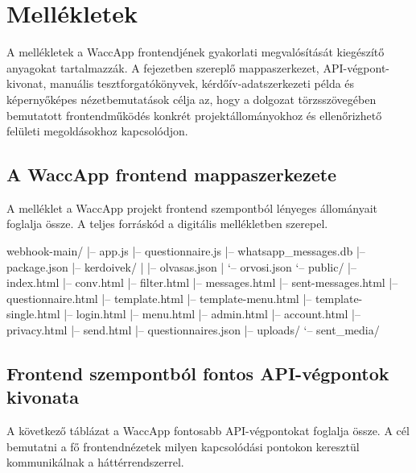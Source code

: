 \chapter{Mellékletek}
A mellékletek a WaccApp frontendjének gyakorlati megvalósítását kiegészítő anyagokat tartalmazzák. A fejezetben szereplő mappaszerkezet, API-végpont-kivonat, manuális tesztforgatókönyvek, kérdőív-adatszerkezeti példa és képernyőképes nézetbemutatások célja az, hogy a dolgozat törzsszövegében bemutatott frontendműködés konkrét projektállományokhoz és ellenőrizhető felületi megoldásokhoz kapcsolódjon.

\section{A WaccApp frontend mappaszerkezete}
A melléklet a WaccApp projekt frontend szempontból lényeges állományait foglalja össze. A teljes forráskód a digitális mellékletben szerepel.
\begin{CodeBlock}
webhook-main/
|-- app.js
|-- questionnaire.js
|-- whatsapp_messages.db
|-- package.json
|-- kerdoivek/
|   |-- olvasas.json
|   `-- orvosi.json
`-- public/
    |-- index.html
    |-- conv.html
    |-- filter.html
    |-- messages.html
    |-- sent-messages.html
    |-- questionnaire.html
    |-- template.html
    |-- template-menu.html
    |-- template-single.html
    |-- login.html
    |-- menu.html
    |-- admin.html
    |-- account.html
    |-- privacy.html
    |-- send.html
    |-- questionnaires.json
    |-- uploads/
    `-- sent_media/
\end{CodeBlock}

\section{Frontend szempontból fontos API-végpontok kivonata}

A következő táblázat a WaccApp fontosabb API-végpontokat foglalja össze. A cél bemutatni a fő frontendnézetek milyen kapcsolódási pontokon keresztül kommunikálnak a háttérrendszerrel.

